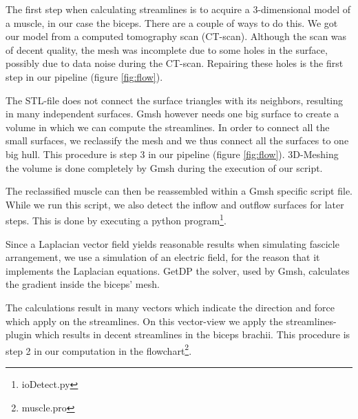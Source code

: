 \documentclass[preprint,journal]{vgtc}       %
\begin{document}
The first step when calculating streamlines is to acquire a 3-dimensional model of a muscle, in our case the biceps.
There are a couple of ways to do this.
We got our model from a computed tomography scan (CT-scan).
Although the scan was of decent quality, the mesh was incomplete due to some holes in the surface, possibly due to data noise during the CT-scan.
Repairing these holes is the first step in our pipeline (figure \ref{fig:flow}). 

The STL-file does not connect the surface triangles with its neighbors, resulting in many independent surfaces. 
Gmsh however needs one big surface to create a volume in which we can compute the streamlines. 
In order to connect all the small surfaces, we reclassify the mesh and we thus connect all the surfaces to one big hull.
This procedure is step 3 in our pipeline (figure \ref{fig:flow}). 
3D-Meshing the volume is done completely by Gmsh during the execution of our script. 

The reclassified muscle can then be reassembled within a Gmsh specific script file.
While we run this script, we also detect the inflow and outflow surfaces for later steps.
This is done by executing a python program\footnote{ioDetect.py}. 
 
Since a Laplacian vector field yields reasonable results when simulating fascicle arrangement, we use a simulation of an electric field, for the reason that it implements the Laplacian equations. 
GetDP the solver, used by Gmsh, calculates the gradient inside the biceps' mesh.

The calculations result in many vectors which indicate the direction and force which apply on the  streamlines. 
On this vector-view we apply the streamlines-plugin which results in decent streamlines in the biceps brachii.
This procedure is step 2 in our computation in the flowchart\footnote{muscle.pro}.
\end{document}
